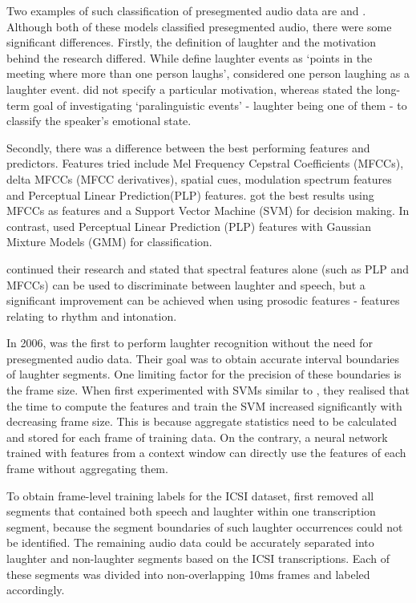 \documentclass[bsc,frontabs,parskip,deptreport]{infthesis}
\begin{document}
Two examples of such classification of presegmented audio data are \citet{kennedy2004laughter} and \citet{truong2005automatic}. 
Although both of these models classified presegmented audio, there were some significant differences. 
Firstly, the definition of laughter and the motivation behind the research differed.
While \citet{kennedy2004laughter} define laughter events as `points in the meeting where more than one person laughs', \citet{truong2005automatic} considered one person laughing as a laughter event.
\citet{kennedy2004laughter} did not specify a particular motivation, whereas \citet{truong2005automatic} stated the long-term goal of investigating `paralinguistic events' - laughter being one of them - to classify the speaker's emotional state.   

Secondly, there was a difference between the best performing features and predictors.  
Features tried include Mel Frequency Cepstral Coefficients (MFCCs), delta MFCCs (MFCC derivatives), spatial cues, modulation spectrum features and Perceptual Linear Prediction(PLP) features. 
\citet{kennedy2004laughter} got the best results using MFCCs as features and a Support Vector Machine (SVM) for decision making.
In contrast, \citet{truong2005automatic} used Perceptual Linear Prediction (PLP) features with Gaussian Mixture Models (GMM) for classification. 

\citet{truong2007automatic} continued their research and stated that spectral features alone (such as PLP and MFCCs) can be used to discriminate between laughter and speech, but a significant improvement can be achieved when using prosodic features - features relating to rhythm and intonation.

In 2006, \citet{knox2006automatic} was the first to perform laughter recognition without the need for presegmented audio data.  
Their goal was to obtain accurate interval boundaries of laughter segments.
One limiting factor for the precision of these boundaries is the frame size. 
When \citet{knox2006automatic} first experimented with SVMs similar to \citet{kennedy2004laughter}, they realised that the time to compute the features and train the SVM increased significantly with decreasing frame size. 
This is because aggregate statistics need to be calculated and stored for each frame of training data.  
On the contrary, a neural network trained with features from a context window can directly use the features of each frame without aggregating them.  

To obtain frame-level training labels for the ICSI dataset, \citet{knox2006automatic} first removed all segments that contained both speech and laughter within one transcription segment, because the segment boundaries of such laughter occurrences could not be identified. 
The remaining audio data could be accurately separated into laughter and non-laughter segments based on the ICSI transcriptions. Each of these segments was divided into non-overlapping 10ms frames and labeled accordingly.
\end{document}
